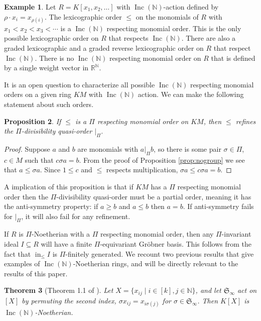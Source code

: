 \documentclass{amsart}
\newtheorem{theorem}{Theorem}[section]
\newtheorem{proposition}[theorem]{Proposition}
\theoremstyle{definition}
\newtheorem{example}[theorem]{Example}
\theoremstyle{remark}
\numberwithin{equation}{section}
\newcommand{\B}[1]{\mathbb #1}
\newcommand{\F}[1]{\mathfrak #1}
\DeclareMathOperator{\initial}{in}
\newcommand{\Inc}{\operatorname{Inc}(\B N)}
\newcommand{\mon}{M}
\newcommand{\Sym}{\F S_\infty}
\newcommand{\LT}{\initial_{\leq}}
\begin{document}
\begin{example}
 Let $R = K[x_1,x_2,\ldots]$ with $\Inc$-action defined by $\rho \cdot x_i = x_{\rho(i)}$.  The lexicographic order $\leq$ on the monomials of $R$ with $x_1 < x_2 < x_3 < \cdots$ is a $\Inc$ respecting monomial order.  This is the only possible lexicographic order on $R$ that respects $\Inc$.  There are also a graded lexicographic and a graded reverse lexicographic order on $R$ that respect $\Inc$.  There is no $\Inc$ respecting monomial order on $R$ that is defined by a single weight vector in $\B R^{\B N}$.
\end{example}

It is an open question to characterize all possible $\Inc$ respecting monomial orders on a given ring $K\mon$ with $\Inc$ action.  We can make the following statement about such orders.

\begin{proposition}
 If $\leq$ is a $\Pi$ respecting monomial order on $K\mon$, then $\leq$ refines the $\Pi$-divisibility quasi-order $|_\Pi$.
\end{proposition}
\begin{proof}
 Suppose $a$ and $b$ are monomials with $a |_\Pi b$, so there is some pair $\sigma \in \Pi$, $c \in \mon$ such that $c\sigma a = b$.  From the proof of Proposition \ref{prop:nogroup} we see that $a \leq \sigma a$.  Since $1 \leq c$ and $\leq$ respects multiplication, $\sigma a \leq c\sigma a = b$.
\end{proof}

A implication of this proposition is that if $K\mon$ has a $\Pi$ respecting monomial order then the $\Pi$-divisibility quasi-order must be a partial order, meaning it has the anti-symmetry property: if $a \geq b$ and $a \leq b$ then $a = b$.  If anti-symmetry fails for $|_\Pi$, it will also fail for any refinement.

If $R$ is $\Pi$-Noetherian with a $\Pi$ respecting monomial order, then any $\Pi$-invariant ideal $I \subseteq R$ will have a finite $\Pi$-equivariant Gr\"obner basis.  This follows from the fact that $\LT I$ is $\Pi$-finitely generated.  We recount two previous results that give examples of $\Inc$-Noetherian rings, and will be directly relevant to the results of this paper.

\begin{theorem}[Theorem 1.1 of \cite{hillar2012finite}]\label{thm:HS}
 Let $X = \{x_{ij} \mid i \in [k], j \in \B N\}$, and let $\Sym$ act on $[X]$ by permuting the second index, $\sigma x_{ij} = x_{i\sigma(j)}$ for $\sigma \in \Sym$.  Then $K[X]$ is $\Inc$-Noetherian.
\end{theorem}
\end{document}
